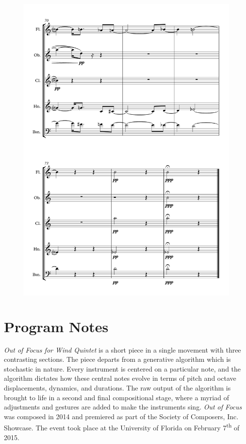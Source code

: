 \begin{figure}[H]
    \centering
	\includegraphics[width=6.5in]{figures/Out_of_Focus_15.pdf}
\end{figure}

\section*{Program Notes}

\emph{Out of Focus for Wind Quintet} is a short piece in a single movement with three contrasting sections. The piece departs from a generative algorithm which is stochastic in nature. Every instrument is centered on a particular note, and the algorithm dictates how these central notes evolve in terms of pitch and octave displacements, dynamics, and durations. The raw output of the algorithm is brought to life in a second and final compositional stage, where a myriad of adjustments and gestures are added to make the instruments sing. \emph{Out of Focus} was composed in 2014 and premiered as part of the Society of Composers, Inc. Showcase. The event took place at the University of Florida on February 7\textsuperscript{th} of 2015.

